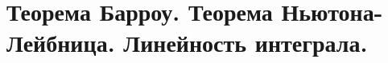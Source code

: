 \documentclass[../main.tex]{subfiles}
\begin{document}
\newpage
\section{Теорема Барроу. Теорема Ньютона-Лейбница. Линейность интеграла.}
\end{document}
